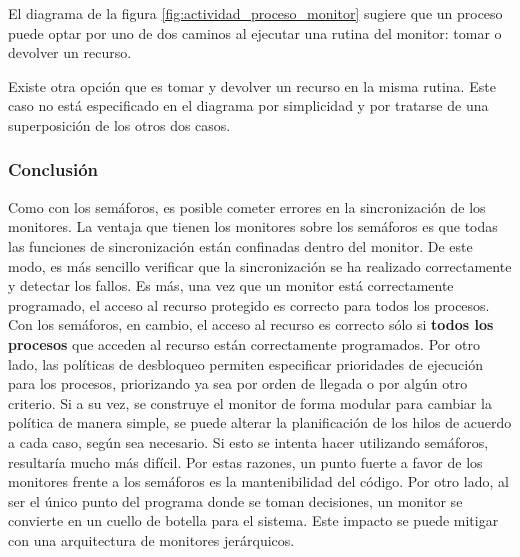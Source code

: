 El diagrama de la figura \ref{fig:actividad_proceso_monitor} sugiere que un
proceso puede optar por uno de dos caminos al ejecutar una rutina del monitor:
tomar o devolver un recurso.

Existe otra opción que es tomar y devolver un recurso en la misma rutina. Este
caso no está especificado en el diagrama por simplicidad y por tratarse de una
superposición de los otros dos casos.

\subsubsection{Conclusión}
Como con los semáforos, es posible cometer errores en la sincronización de los
monitores. La ventaja que tienen los monitores sobre los semáforos es que todas
las funciones de sincronización están confinadas dentro del monitor. De este
modo, es más sencillo verificar que la sincronización se ha realizado
correctamente y detectar los fallos. Es más, una vez que un monitor está
correctamente programado, el acceso al recurso protegido es correcto para todos
los procesos. Con los semáforos, en cambio, el acceso al recurso es correcto
sólo si \textbf{todos los procesos} que acceden al recurso están correctamente
programados.\cite{SistOpStallings} Por otro lado, las políticas de desbloqueo
permiten especificar prioridades de ejecución para los procesos, priorizando ya
sea por orden de llegada o por algún otro criterio. Si a su vez, se construye
el monitor de forma modular para cambiar la política de manera simple, se puede
alterar la planificación de los hilos de acuerdo a cada caso, según sea
necesario. Si esto se intenta hacer utilizando semáforos, resultaría mucho más
difícil.
Por estas razones, un punto fuerte a favor de los monitores frente a los semáforos es la mantenibilidad del código.
Por otro lado, al ser el único punto del programa donde se toman decisiones, un monitor se convierte en un cuello de botella para el sistema. Este impacto se puede mitigar con una arquitectura de monitores jerárquicos.
